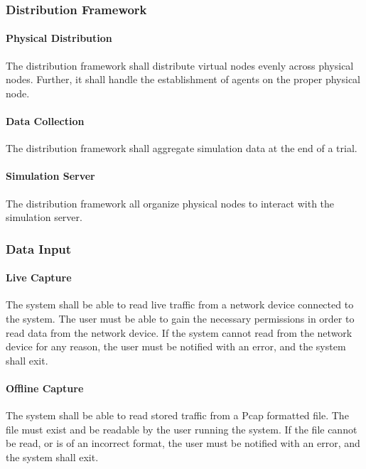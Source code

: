 \documentclass[titlepage]{article}
\begin{document}
\subsubsection{Distribution Framework}
\paragraph{Physical Distribution} The distribution framework shall distribute virtual nodes evenly across physical
nodes.  Further, it shall handle the establishment of agents on the proper physical node.

\paragraph{Data Collection} The distribution framework shall aggregate simulation data at the end of a trial.

\paragraph{Simulation Server} The distribution framework all organize physical nodes to interact with the simulation
server.


\subsubsection{Data Input} \label{data_input}

\paragraph{Live Capture}

The system shall be able to read live traffic from a network device connected
to the system.  The user must be able to gain the necessary permissions in
order to read data from the network device.  If the system cannot read from the
network device for any reason, the user must be notified with an error, and the
system shall exit.

\paragraph{Offline Capture}

The system shall be able to read stored traffic from a Pcap formatted file.
The file must exist and be readable by the user running the system.  If the
file cannot be read, or is of an incorrect format, the user must be notified
with an error, and the system shall exit.
\end{document}
